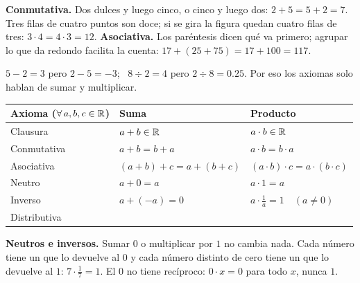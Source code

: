 \documentclass[11pt,a4paper]{article}
\begin{document}
\textbf{Conmutativa.} Dos dulces y luego cinco, o cinco y luego dos: $2+5=5+2=7$. Tres filas de cuatro puntos son
doce; si se gira la figura quedan cuatro filas de tres: $3\cdot4=4\cdot3=12$.
\textbf{Asociativa.} Los paréntesis dicen qué va primero; agrupar lo que da redondo facilita la cuenta:
$17+(25+75)=17+100=117$.

\begin{ojo}
$5-2=3$ pero $2-5=-3$; \ $8\div2=4$ pero $2\div8=0.25$. Por eso los axiomas solo hablan de sumar y multiplicar.
\end{ojo}
\begin{center}\small\renewcommand{\arraystretch}{1.12}
\begin{tabularx}{\linewidth}{@{}l >{\centering\arraybackslash}X >{\centering\arraybackslash}X@{}}
\toprule
Axioma ($\forall\, a,b,c\in\mathbb{R}$) & Suma & Producto\\ \midrule
Clausura & $a+b\in\mathbb{R}$ & $a\cdot b\in\mathbb{R}$\\
Conmutativa & $a+b=b+a$ & $a\cdot b=b\cdot a$\\
Asociativa & $(a+b)+c=a+(b+c)$ & $(a\cdot b)\cdot c=a\cdot(b\cdot c)$\\
Neutro & $a+0=a$ & $a\cdot1=a$\\
Inverso & $a+(-a)=0$ & $a\cdot\tfrac1a=1\quad(a\neq0)$\\
Distributiva & \multicolumn{2}{c}{$a\cdot(b+c)=a\cdot b+a\cdot c$}\\
\bottomrule
\end{tabularx}
\end{center}

\textbf{Neutros e inversos.} Sumar $0$ o multiplicar por $1$ no cambia nada. Cada número tiene un  que lo
devuelve al $0$ y cada número distinto de cero tiene un  que lo devuelve al $1$: $7\cdot\tfrac17=1$.
El $0$ no tiene recíproco: $0\cdot x=0$ para todo $x$, nunca $1$.
\end{document}
